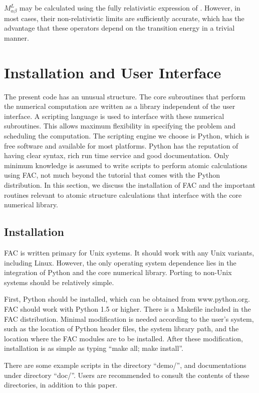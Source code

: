\documentclass{elsart}
\begin{document}
$M^L_{\alpha\beta}$ may be calculated using the fully relativistic
expression of \citet{grant74}. However, in most cases, their non-relativistic
limits are sufficiently accurate, which has the advantage that these operators
depend on the transition energy in a trivial manner. 

\section{Installation and User Interface}
\label{sec_program}
The present code has an unusual structure. The core subroutines that
perform the numerical computation are written as a library independent of the
user interface. A scripting language is used to interface with these numerical
subroutines. This allows maximum flexibility in specifying the problem and
scheduling the computation. The scripting engine we choose is Python, 
which is free software and available for most
platforms. Python has the reputation of having clear syntax, rich run time
service and good documentation. Only minimum knowledge is assumed to write
scripts to perform atomic calculations using FAC, not much beyond the tutorial
that comes with the Python distribution. In this section, we discuss the
installation of FAC and the important routines relevant to atomic structure
calculations that interface with the core numerical library.

\subsection{Installation}
FAC is written primary for Unix systems. It should work with any Unix variants,
including Linux. However, the only operating system dependence lies in the
integration of Python and the core numerical library. Porting to 
non-Unix systems should be relatively simple. 

First, Python should be installed, which can be obtained from
www.python.org. FAC should work with Python 1.5 or higher. There is a Makefile
included in the FAC distribution. Minimal modification is needed according to
the user's system, such as the location of Python header files, the system
library path, and the location where the FAC modules are to be
installed. After these 
modification, installation is as simple as typing ``make all; make install''. 

There are some example scripts in the directory ``demo/'', and documentations
under directory ``doc/''. Users are recommended to consult the contents of
these directories, in addition to this paper. 
\end{document}
